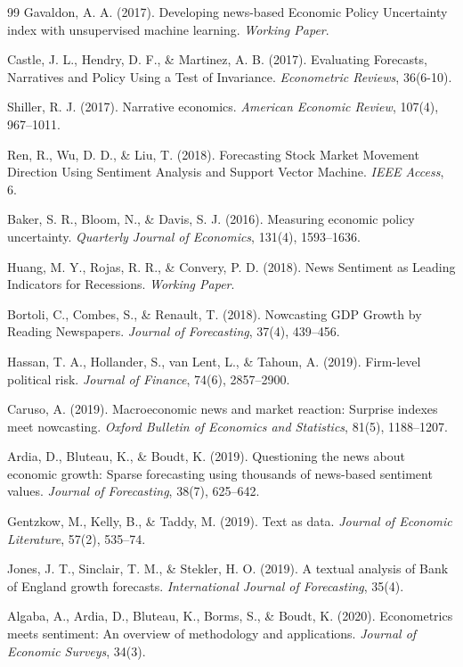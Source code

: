 \documentclass[11pt]{article}
\begin{document}
\begin{thebibliography}{99}
 Gavaldon, A. A. (2017). Developing news-based Economic Policy Uncertainty index with unsupervised machine learning. \textit{Working Paper}.

 Castle, J. L., Hendry, D. F., \& Martinez, A. B. (2017). Evaluating Forecasts, Narratives and Policy Using a Test of Invariance. \textit{Econometric Reviews}, 36(6-10).

 Shiller, R. J. (2017). Narrative economics. \textit{American Economic Review}, 107(4), 967--1011.

 Ren, R., Wu, D. D., \& Liu, T. (2018). Forecasting Stock Market Movement Direction Using Sentiment Analysis and Support Vector Machine. \textit{IEEE Access}, 6.

 Baker, S. R., Bloom, N., \& Davis, S. J. (2016). Measuring economic policy uncertainty. \textit{Quarterly Journal of Economics}, 131(4), 1593--1636.

 Huang, M. Y., Rojas, R. R., \& Convery, P. D. (2018). News Sentiment as Leading Indicators for Recessions. \textit{Working Paper}.

 Bortoli, C., Combes, S., \& Renault, T. (2018). Nowcasting GDP Growth by Reading Newspapers. \textit{Journal of Forecasting}, 37(4), 439--456.

 Hassan, T. A., Hollander, S., van Lent, L., \& Tahoun, A. (2019). Firm-level political risk. \textit{Journal of Finance}, 74(6), 2857--2900.

 Caruso, A. (2019). Macroeconomic news and market reaction: Surprise indexes meet nowcasting. \textit{Oxford Bulletin of Economics and Statistics}, 81(5), 1188--1207.

 Ardia, D., Bluteau, K., \& Boudt, K. (2019). Questioning the news about economic growth: Sparse forecasting using thousands of news-based sentiment values. \textit{Journal of Forecasting}, 38(7), 625--642.

 Gentzkow, M., Kelly, B., \& Taddy, M. (2019). Text as data. \textit{Journal of Economic Literature}, 57(2), 535--74.

 Jones, J. T., Sinclair, T. M., \& Stekler, H. O. (2019). A textual analysis of Bank of England growth forecasts. \textit{International Journal of Forecasting}, 35(4).

 Algaba, A., Ardia, D., Bluteau, K., Borms, S., \& Boudt, K. (2020). Econometrics meets sentiment: An overview of methodology and applications. \textit{Journal of Economic Surveys}, 34(3).


\end{thebibliography}
\end{document}
